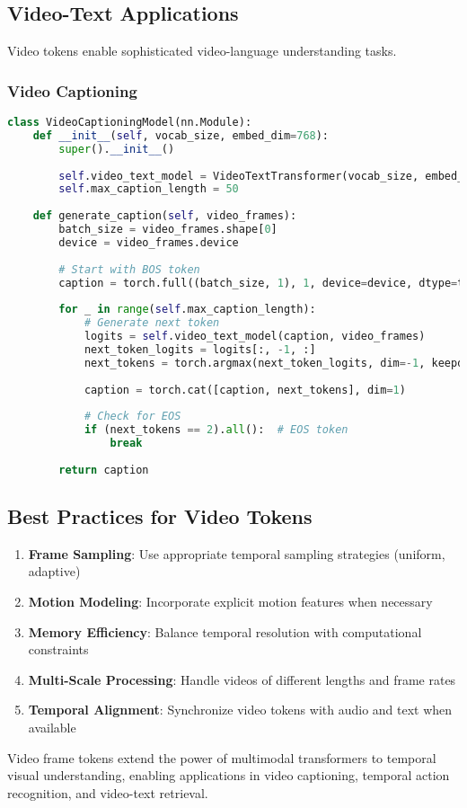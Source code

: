 \subsection{Video-Text Applications}

Video tokens enable sophisticated video-language understanding tasks.

\subsubsection{Video Captioning}

\begin{lstlisting}[language=Python, caption=Video captioning with temporal tokens]
class VideoCaptioningModel(nn.Module):
    def __init__(self, vocab_size, embed_dim=768):
        super().__init__()
        
        self.video_text_model = VideoTextTransformer(vocab_size, embed_dim)
        self.max_caption_length = 50
        
    def generate_caption(self, video_frames):
        batch_size = video_frames.shape[0]
        device = video_frames.device
        
        # Start with BOS token
        caption = torch.full((batch_size, 1), 1, device=device, dtype=torch.long)
        
        for _ in range(self.max_caption_length):
            # Generate next token
            logits = self.video_text_model(caption, video_frames)
            next_token_logits = logits[:, -1, :]
            next_tokens = torch.argmax(next_token_logits, dim=-1, keepdim=True)
            
            caption = torch.cat([caption, next_tokens], dim=1)
            
            # Check for EOS
            if (next_tokens == 2).all():  # EOS token
                break
        
        return caption
\end{lstlisting}

\subsection{Best Practices for Video Tokens}

\begin{enumerate}
\item \textbf{Frame Sampling}: Use appropriate temporal sampling strategies (uniform, adaptive)
\item \textbf{Motion Modeling}: Incorporate explicit motion features when necessary
\item \textbf{Memory Efficiency}: Balance temporal resolution with computational constraints
\item \textbf{Multi-Scale Processing}: Handle videos of different lengths and frame rates
\item \textbf{Temporal Alignment}: Synchronize video tokens with audio and text when available
\end{enumerate}

Video frame tokens extend the power of multimodal transformers to temporal visual understanding, enabling applications in video captioning, temporal action recognition, and video-text retrieval.
